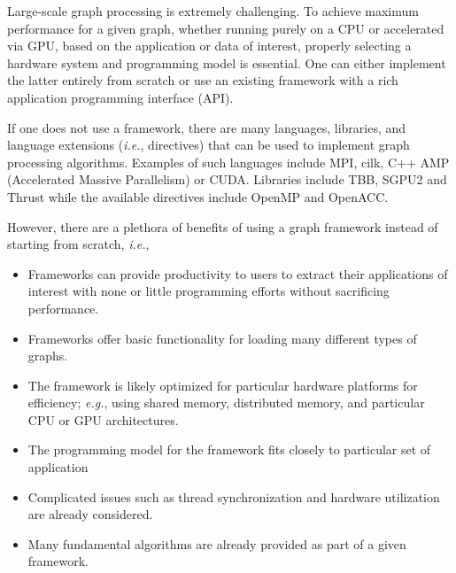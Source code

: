 Large-scale graph processing is extremely challenging.  To achieve maximum performance for a given graph, whether running purely on a CPU or accelerated via GPU, based on the application or data of interest, properly selecting a hardware system and programming model is essential.  One can either implement the latter entirely from scratch or use an existing framework with a rich application programming interface (API).

If one does not use a framework, there are many languages, libraries, and language extensions (\emph{i.e.}, directives) that can be used to implement graph processing algorithms. Examples of such
languages include MPI, cilk, C++ AMP (Accelerated Massive Parallelism) or CUDA.  Libraries include TBB, SGPU2 and Thrust while the available directives include OpenMP and OpenACC\cite{edwards2014kokkos}.

However, there are a plethora of benefits of using a graph framework instead of starting from scratch, \emph{i.e.},
\begin{itemize}
    \item Frameworks can provide productivity to users to extract their applications of interest with none or little programming efforts without sacrificing performance.
    \item Frameworks offer basic functionality for loading many different types of graphs.
    \item The framework is likely optimized for particular hardware platforms for efficiency; \emph{e.g.}, using shared memory, distributed memory, and particular CPU or GPU architectures.
    \item The programming model for the framework fits closely to particular set of application %
    \item Complicated issues such as thread synchronization and hardware utilization are already considered.
    \item Many fundamental algorithms are already provided as part of a given framework.
\end{itemize}


